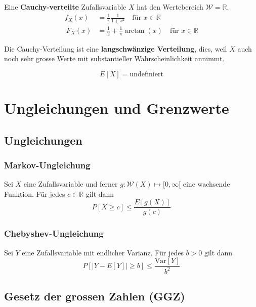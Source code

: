 \documentclass[11pt]{article}
\newcommand{\Var}{\text{Var}}
\begin{document}
Eine \textbf{Cauchy-verteilte} Zufallsvariable $X$ hat den Wertebereich $\mathcal{W} = \mathbb{R}$.
\begin{equation*}
\begin{split}
	f_X(x) & = \frac{1}{\pi}\frac{1}{1+x^2}\quad\text{f{\"u}r }x \in \mathbb{R} \\\
	F_X(x) & = \frac{1}{2}+\frac{1}{\pi}\arctan(x)\quad\text{f{\"u}r }x \in \mathbb{R}
\end{split}
\end{equation*}

Die Cauchy-Verteilung ist eine \textbf{langschw{\"a}nzige Verteilung}, dies, weil $X$ auch noch sehr grosse Werte mit substantieller Wahrscheinlichkeit annimmt.

\begin{equation*}
	E[X] = \text{undefiniert}
\end{equation*}

\section{Ungleichungen und Grenzwerte}

\subsection{Ungleichungen}

\subsubsection{Markov-Ungleichung}

Sei $X$ eine Zufallsvariable und ferner $g: \mathcal{W}(X) \mapsto [0, \infty[$ eine wachsende Funktion. F{\"u}r jedes $c \in \mathbb{R}$ gilt dann
\begin{equation*}
	P[X \geq c] \leq \frac{E[g(X)]}{g(c)}
\end{equation*}

\subsubsection{Chebyshev-Ungleichung}

Sei $Y$ eine Zufallsvariable mit endlicher Varianz. F{\"u}r jedes $b > 0$ gilt dann
\begin{equation*}
	P[|Y - E[Y]| \geq b] \leq \frac{\Var[Y]}{b^2}
\end{equation*}

\subsection{Gesetz der grossen Zahlen (GGZ)}
\end{document}
